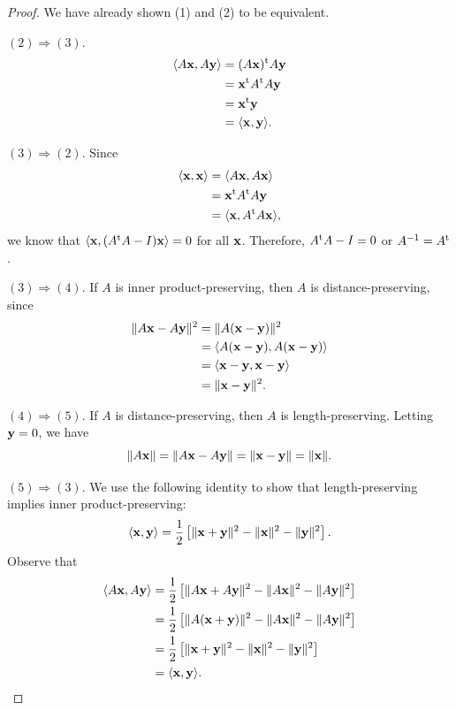  
\begin{proof}
We have already shown (1) and (2) to be equivalent.
 
$(2) \Rightarrow (3)$.
\begin{align*}
\langle A{\bold x}, A{\bold y} \rangle
& =
(A {\bold x})^{\rm t} A {\bold y} \\
& =
{\bold x}^{\rm t} A^{\rm t} A {\bold y} \\
& =
{\bold x}^{\rm t} {\bold y} \\
& =
\langle {\bold x}, {\bold y} \rangle.
\end{align*}
 
$(3) \Rightarrow (2)$.
Since
\begin{align*}
\langle {\bold x}, {\bold x} \rangle
& =
\langle A{\bold x}, A{\bold x} \rangle \\
& =
{\bold x}^{\rm t} A^{\rm t} A {\bold y} \\
& =
\langle {\bold x}, A^{\rm t} A{\bold x} \rangle,
\end{align*}
we know that $\langle {\bold x}, (A^{\rm t} A - I){\bold x} \rangle =
0$ for all ${\bold x}$.  Therefore, $A^{\rm t} A -I = 0$ or $A^{-1} =
A^{\rm t}$. 
 
 
$(3) \Rightarrow (4)$.
If $A$ is inner product-preserving, then $A$ is distance-preserving,
since 
\begin{align*}
\| A{\bold x} - A{\bold y} \|^2
& =
\| A({\bold x} - {\bold y}) \|^2 \\
& =
\langle
A({\bold x} - {\bold y}), A({\bold x} - {\bold y})
\rangle \\
& =
\langle
{\bold x} - {\bold y}, {\bold x} - {\bold y}
\rangle \\
& =
\| {\bold x} - {\bold y} \|^2.
\end{align*}
 
 
$(4) \Rightarrow (5)$.
If $A$ is distance-preserving, then $A$ is length-preserving. Letting
${\bold y} = 0$, we have
\[
\| A{\bold x}\|
= \| A{\bold x}- A{\bold y} \|
= \| {\bold x}- {\bold y} \|
= \| {\bold x} \|.
\]
 
 
$(5) \Rightarrow (3)$.
We use the following identity to show that length-preserving implies
inner product-preserving: 
\[
\langle {\bold x}, {\bold y} \rangle
=
\frac{1}{2}
\left[
\|{\bold x} +{\bold y}\|^2 -
 \|{\bold x}\|^2 - \|{\bold y}\|^2
\right].
\]
Observe that
\begin{align*}
\langle A {\bold x}, A {\bold y} \rangle
& =
\frac{1}{2}
\left[
\|A {\bold x} + A {\bold y} \|^2
- \|A {\bold x} \|^2 -  \|A {\bold y} \|^2
\right] \\
& =
\frac{1}{2}
\left[
\|A ( {\bold x} + {\bold y} ) \|^2
- \|A {\bold x} \|^2 -  \|A {\bold y} \|^2
\right] \\
& =
\frac{1}{2}
\left[
\|{\bold x} + {\bold y}\|^2
- \|{\bold x}\|^2 - \|{\bold y}\|^2
\right] \\
& =
\langle {\bold x}, {\bold y} \rangle.
\end{align*}
\end{proof}
 

